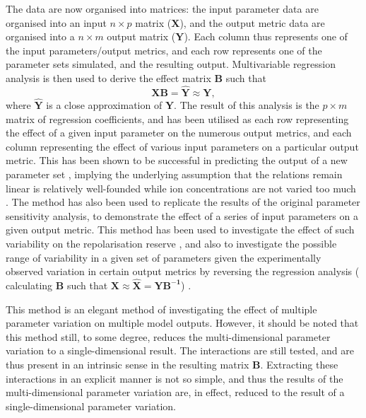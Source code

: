 \documentclass[../thesis-main.tex]{subfiles}
\begin{document}
The data are now organised into matrices: the input parameter data are organised into an input $n\times p$ matrix ($\mathbf{X}$), and the output metric data are organised into a $n\times m$ output matrix ($\mathbf{Y}$). Each column thus represents one of the input parameters/output metrics, and each row represents one of the parameter sets simulated, and the resulting output. Multivariable regression analysis is then used to derive the effect matrix $\mathbf{B}$ such that
\begin{equation}
 \mathbf{XB} = \mathbf{\hat{Y}} \approx \mathbf{Y},
\end{equation}
where $\mathbf{\hat{Y}}$ is a close approximation of $\mathbf{Y}$. The result of this analysis is the $p\times m$ matrix of regression coefficients, and has been utilised as each row representing the effect of a given input parameter on the numerous output metrics, and each column representing the effect of various input parameters on a particular output metric. This has been shown to be successful in predicting the output of a new parameter set \citep{Sobie2009}, implying the underlying assumption that the relations remain linear is relatively well-founded while ion concentrations are not varied too much \citep{Sobie2009, Sarkar2010}. The method has also been used to replicate the results of the original parameter sensitivity analysis, \idest{} to demonstrate the effect of a series of input parameters on a given output metric. This method has been used to investigate the effect of such variability on the repolarisation reserve \citep{Sarkar2011}, and also to investigate the possible range of variability in a given set of parameters given the experimentally observed variation in certain output metrics by reversing the regression analysis (\idest{} calculating $\mathbf{B}$ such that $\mathbf{X} \approx \mathbf{\hat{X}} = \mathbf{YB^{-1}}$) \citep{Sarkar2010}.

This method is an elegant method of investigating the effect of multiple parameter variation on multiple model outputs. However, it should be noted that this method still, to some degree, reduces the multi-dimensional parameter variation to a single-dimensional result. The interactions are still tested, and are thus present in an intrinsic sense in the resulting matrix $\mathbf{B}$. Extracting these interactions in an explicit manner is not so simple, and thus the results of the multi-dimensional parameter variation are, in effect, reduced to the result of a single-dimensional parameter variation.
\end{document}
